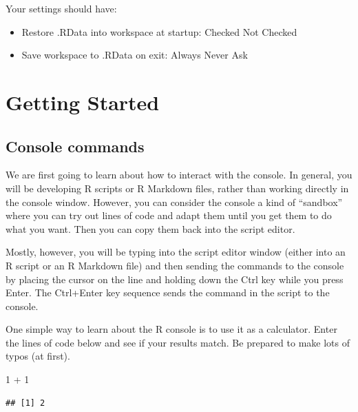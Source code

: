 \documentclass[
  oneside]{book}
\newenvironment{Shaded}{\begin{snugshade}}{\end{snugshade}}
\newcommand{\DecValTok}[1]{\textcolor[rgb]{0.00,0.00,0.81}{#1}}
\newcommand{\SpecialCharTok}[1]{\textcolor[rgb]{0.00,0.00,0.00}{#1}}
\providecommand{\tightlist}{%
  \setlength{\itemsep}{0pt}\setlength{\parskip}{0pt}}
\begin{document}
\begin{try}

Your settings should have:

\begin{itemize}
\tightlist
\item
  Restore .RData into workspace at startup: Checked Not Checked
\item
  Save workspace to .RData on exit: Always Never Ask
\end{itemize}

\end{try}

\hypertarget{getting-started}{%
\section{Getting Started}\label{getting-started}}

\hypertarget{console}{%
\subsection{Console commands}\label{console}}

We are first going to learn about how to interact with the console. In general, you will be developing R scripts or R Markdown files, rather than working directly in the console window. However, you can consider the console a kind of ``sandbox'' where you can try out lines of code and adapt them until you get them to do what you want. Then you can copy them back into the script editor.

Mostly, however, you will be typing into the script editor window (either into an R script or an R Markdown file) and then sending the commands to the console by placing the cursor on the line and holding down the Ctrl key while you press Enter. The Ctrl+Enter key sequence sends the command in the script to the console.

One simple way to learn about the R console is to use it as a calculator. Enter the lines of code below and see if your results match. Be prepared to make lots of typos (at first).

\begin{Shaded}
\begin{Highlighting}[]
\DecValTok{1} \SpecialCharTok{+} \DecValTok{1}
\end{Highlighting}
\end{Shaded}

\begin{verbatim}
## [1] 2
\end{verbatim}
\end{document}

